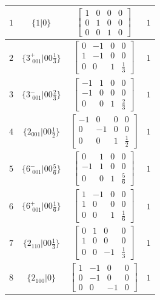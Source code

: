 \documentclass[fleqn,8pt]{jsarticle}
\begin{document}
\begin{longtable}{cccc}
$ 1 $ & $ \{1|0\} $ & $ \begin{bmatrix} 1 & 0 & 0 & 0 \\ 0 & 1 & 0 & 0 \\ 0 & 0 & 1 & 0 \end{bmatrix} $ & $ 1 $ \\ \hline
$ 2 $ & $ \{3^{+}_{\,\,001}|0 0 \frac{1}{3}\} $ & $ \begin{bmatrix} 0 & -1 & 0 & 0 \\ 1 & -1 & 0 & 0 \\ 0 & 0 & 1 & \frac{1}{3} \end{bmatrix} $ & $ 1 $ \\ \hline
$ 3 $ & $ \{3^{-}_{\,\,001}|0 0 \frac{2}{3}\} $ & $ \begin{bmatrix} -1 & 1 & 0 & 0 \\ -1 & 0 & 0 & 0 \\ 0 & 0 & 1 & \frac{2}{3} \end{bmatrix} $ & $ 1 $ \\ \hline
$ 4 $ & $ \{2{}_{001}|0 0 \frac{1}{2}\} $ & $ \begin{bmatrix} -1 & 0 & 0 & 0 \\ 0 & -1 & 0 & 0 \\ 0 & 0 & 1 & \frac{1}{2} \end{bmatrix} $ & $ 1 $ \\ \hline
$ 5 $ & $ \{6^{-}_{\,\,001}|0 0 \frac{5}{6}\} $ & $ \begin{bmatrix} 0 & 1 & 0 & 0 \\ -1 & 1 & 0 & 0 \\ 0 & 0 & 1 & \frac{5}{6} \end{bmatrix} $ & $ 1 $ \\ \hline
$ 6 $ & $ \{6^{+}_{\,\,001}|0 0 \frac{1}{6}\} $ & $ \begin{bmatrix} 1 & -1 & 0 & 0 \\ 1 & 0 & 0 & 0 \\ 0 & 0 & 1 & \frac{1}{6} \end{bmatrix} $ & $ 1 $ \\ \hline
$ 7 $ & $ \{2{}_{110}|0 0 \frac{1}{3}\} $ & $ \begin{bmatrix} 0 & 1 & 0 & 0 \\ 1 & 0 & 0 & 0 \\ 0 & 0 & -1 & \frac{1}{3} \end{bmatrix} $ & $ 1 $ \\ \hline
$ 8 $ & $ \{2{}_{100}|0\} $ & $ \begin{bmatrix} 1 & -1 & 0 & 0 \\ 0 & -1 & 0 & 0 \\ 0 & 0 & -1 & 0 \end{bmatrix} $ & $ 1 $ \\ \hline

\end{longtable}
\end{document}
